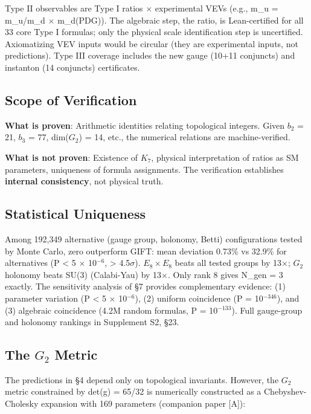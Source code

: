 \documentclass[11pt,a4paper]{article}
\begin{document}
Type II observables are Type I ratios \(\times\) experimental VEVs
(e.g., m\_u = m\_u/m\_d \(\times\) m\_d(PDG)). The algebraic step,
the ratio, is Lean-certified for all 33 core Type I formulas; only
the physical scale identification step is uncertified. Axiomatizing VEV
inputs would be circular (they are experimental inputs, not
predictions). Type III coverage includes the new gauge (10+11 conjuncts)
and instanton (14 conjuncts) certificates.

\subsection{Scope of Verification}

\textbf{What is proven}: Arithmetic identities relating topological
integers. Given \(b_{2}\) = 21, \(b_{3}\) = 77, dim(\(G_{2}\)) = 14,
etc., the numerical relations are machine-verified.

\textbf{What is not proven}: Existence of \(K_{7}\), physical
interpretation of ratios as SM parameters, uniqueness of formula
assignments. The verification establishes \textbf{internal consistency},
not physical truth.

\subsection{Statistical Uniqueness}

Among 192,349 alternative (gauge group, holonomy, Betti) configurations
tested by Monte Carlo, zero outperform GIFT: mean deviation 0.73\% vs
32.9\% for alternatives (P \textless{} 5 \(\times\) 10\(^{-6}\),
\textgreater{} 4.5\(\sigma\)). \(E_{8} \times E_{8}\) beats all tested
groups by 13\(\times\); \(G_{2}\) holonomy beats SU(3) (Calabi-Yau) by
13\(\times\). Only rank 8 gives N\_gen = 3 exactly. The sensitivity
analysis of §7 provides complementary evidence: (1) parameter variation
(P \textless{} 5 \(\times\) 10\(^{-6}\)), (2) uniform coincidence (P =
10\(^{-346}\)), and (3) algebraic coincidence (4.2M random formulas, P =
10\(^{-133}\)). Full gauge-group and holonomy rankings in Supplement S2,
§23.

\subsection{\texorpdfstring{The \(G_{2}\)
Metric}{The G\_\{2\} Metric}}\label{the-g_2-metric}

The predictions in §4 depend only on topological invariants. However,
the \(G_{2}\) metric constrained by det(g) = 65/32 is numerically
constructed as a Chebyshev-Cholesky expansion with 169 parameters
(companion paper [A]):
\end{document}
